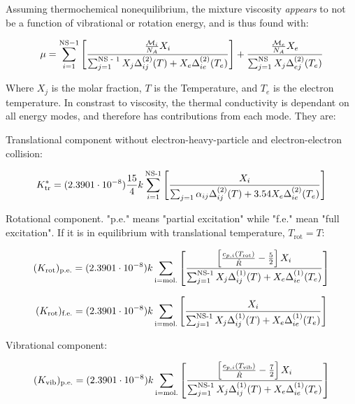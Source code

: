 \documentclass[10pt]{article}
\begin{document}
\begin{flushleft}
\begin{definition}
    Assuming thermochemical nonequilibrium, the mixture viscosity \textit{appears} to not be a function of vibrational or rotation energy, and is thus found with:

    \begin{equation}
        \mu = \sum_{i=1}^{\text{NS} - 1} \left[ \frac{\frac{\mathcal{M}_i}{N_A}X_i}{\sum_{j=1}^\text{NS - 1} X_j \Delta_{ij}^{(2)}(T) + X_e \Delta_{ie}^{(2)}(T_e) } \right] + \frac{\frac{\mathcal{M}_e}{N_A} X_e }{\sum_{j=1}^\text{NS} X_j \Delta_{ej}^{(2)}(T_e)}
    \end{equation}

    Where $X_j$ is the molar fraction, $T$ is the Temperature, and $T_e$ is the electron temperature. In constrast to viscosity, the thermal conductivity is dependant on all energy modes, and therefore has contributions from each mode. They are:
    \vspace{5mm}

    Translational component without electron-heavy-particle and electron-electron collision:

    \begin{equation}
        K_\text{tr}^* = (2.3901 \cdot 10^{-8}) \frac{15}{4} k \sum_{i=1}^\text{NS-1} \left[ \frac{X_i}{\sum_{j=1} \alpha_{ij} \Delta_{ij}^{(2)}(T) + 3.54 X_e \Delta_{ie}^{(2)}(T_e) } \right]
    \end{equation}

    Rotational component. "p.e." means  "partial excitation" while "f.e." mean "full excitation". If it is in equilibrium with translational temperature, $T_\text{rot} = T$:

    \begin{equation}
        (K_\text{rot})_\text{p.e.} = (2.3901 \cdot 10^{-8})k \sum_\text{i=mol.} \left[ \frac{\left[ \frac{c_{p,i}(T_\text{rot})}{\hat{R}} - \frac{5}{2} \right] X_i}{\sum_{j=1}^\text{NS-1}X_j \Delta_{ij}^{(1)}(T) + X_e \Delta_{ie}^{(1)}(T_e)} \right]
    \end{equation}

    \begin{equation}
        (K_\text{rot})_\text{f.e.} = (2.3901 \cdot 10^{-8})k \sum_\text{i=mol.} \left[ \frac{X_i}{\sum_{j=1}^\text{NS-1}X_j \Delta_{ij}^{(1)}(T) + X_e \Delta_{ie}^{(1)}(T_e)} \right]
    \end{equation}


    Vibrational component:

    \begin{equation}
        (K_\text{vib})_\text{p.e.} = (2.3901 \cdot 10^{-8})k \sum_\text{i=mol.} \left[ \frac{\left[ \frac{c_{p,i}(T_\text{vib})}{\hat{R}} - \frac{7}{2} \right] X_i}{\sum_{j=1}^\text{NS-1}X_j \Delta_{ij}^{(1)}(T) + X_e \Delta_{ie}^{(1)}(T_e)} \right]
    \end{equation}


\end{definition}
\end{flushleft}
\end{document}
